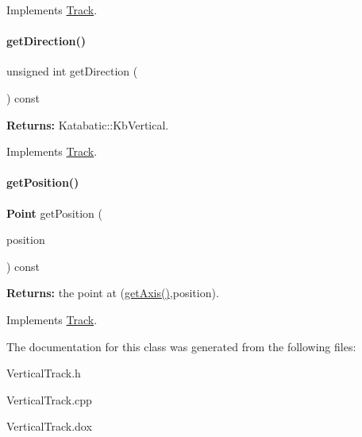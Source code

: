 Implements \hyperlink{classKite_1_1Track_a6fa2bf0568a2b295dd7cd1f7207247d5}{Track}.

\mbox{\label{classKite_1_1VerticalTrack_a0dd7cf705ace42c662c289955313b2e9}} 
\paragraph{\texorpdfstring{get\+Direction()}{getDirection()}}
{\footnotesize\ttfamily unsigned int get\+Direction (\begin{DoxyParamCaption}{ }\end{DoxyParamCaption}) const\hspace{0.3cm}{\ttfamily [virtual]}}

{\bfseries Returns\+:} Katabatic\+::\+Kb\+Vertical. 

Implements \hyperlink{classKite_1_1Track_ae35b78590ed6aa546b626ef95f28c533}{Track}.

\mbox{\label{classKite_1_1VerticalTrack_a6ab4f8026e4500918aa8721f1199f8b6}} 
\paragraph{\texorpdfstring{get\+Position()}{getPosition()}}
{\footnotesize\ttfamily \textbf{ Point} get\+Position (\begin{DoxyParamCaption}\item[{\textbf{ Db\+U\+::\+Unit}}]{position }\end{DoxyParamCaption}) const\hspace{0.3cm}{\ttfamily [virtual]}}

{\bfseries Returns\+:} the point at {\ttfamily }(\hyperlink{classKite_1_1Track_ab5b5aaa5b318369feee6003dbad039c2}{get\+Axis()},position). 

Implements \hyperlink{classKite_1_1Track_a2a033f90e528d3d07aa33694dd733200}{Track}.



The documentation for this class was generated from the following files\+:\begin{DoxyCompactItemize}
\item 
Vertical\+Track.\+h\item 
Vertical\+Track.\+cpp\item 
Vertical\+Track.\+dox\end{DoxyCompactItemize}
